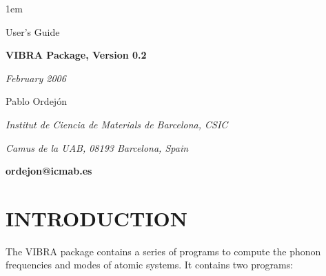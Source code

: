 %



\textheight 22cm
\textwidth 16cm
\oddsidemargin 1mm
\topmargin -15mm

\baselineskip=14pt
\parskip 5pt
\parindent 1em




\begin{titlepage}

\begin{center}

\vspace{1cm}

{\huge {\sc User's Guide}}

\vspace{3cm}

{\Huge {\bf VIBRA Package, Version 0.2}}

\vspace{3cm}

{\Large {\it February 2006}}

\vspace{3cm}

{\Large Pablo Ordej\'on}

\vspace{5pt}

{\it Institut de Ciencia de Materials de Barcelona, CSIC}

{\it Camus de la UAB, 08193 Barcelona, Spain}

\vspace{5pt}

{\bf ordejon@icmab.es}


\end{center}

\end{titlepage}


%



\section{INTRODUCTION}

\noindent
The VIBRA package contains a series of programs to compute the
phonon frequencies and modes of atomic systems. It contains two 
programs:

